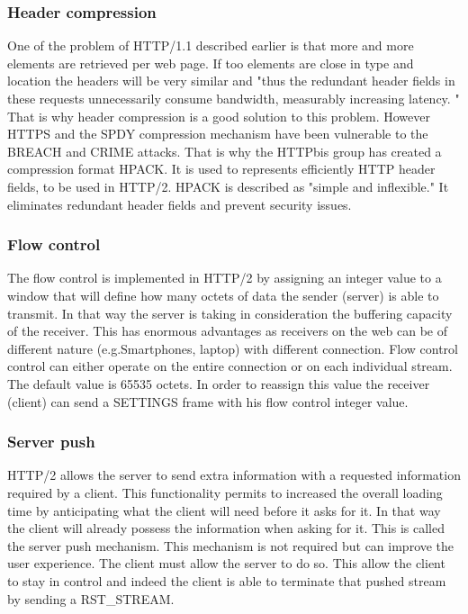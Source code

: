 \subsubsection{Header compression}
One of the problem of HTTP/1.1 described earlier is that more and more elements are retrieved per web page. If too elements are close in type and location the headers will be very similar and "thus the redundant header fields in these requests unnecessarily consume bandwidth, measurably increasing latency. "\cite{hpack} That is why header compression is a good solution to this problem. However HTTPS and the SPDY compression mechanism have been vulnerable to the BREACH\cite{breach} and CRIME\cite{crime} attacks. That is why the HTTPbis group has created a compression format HPACK\cite{hpack}. It is used to represents efficiently HTTP header fields, to be used in HTTP/2. HPACK is described as "simple and inflexible."\cite{hpack} It eliminates redundant header fields and prevent security issues.

\subsubsection{Flow control}
The flow control is implemented in HTTP/2 by assigning an integer value to a window that will define how many octets of data the sender (server) is able to transmit. In that way the server is taking in consideration the buffering capacity of the receiver. This has enormous advantages as receivers on the web can be of different nature (e.g.Smartphones, laptop) with different connection. Flow control control can either operate on the entire connection or on each individual stream. The default value is 65535 octets. In order to reassign this value the receiver (client) can send a SETTINGS frame with his flow control integer value.

\subsubsection{Server push}
HTTP/2 allows the server to send extra information with a requested information required by a client. This functionality permits to increased the overall loading time by anticipating what the client will need before it asks for it. In that way the client will already possess the information when asking for it. This is called the server push mechanism. This mechanism is not required but can improve the user experience. The client must allow the server to do so. This allow the client to stay in control and indeed the client is able to terminate that pushed stream by sending a RST\_STREAM.

